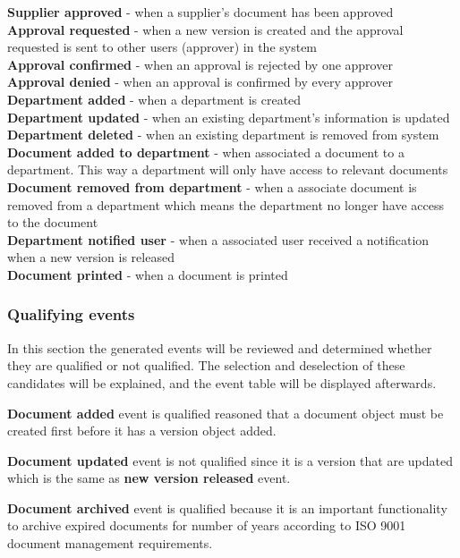 \textbf{Supplier approved} - when a supplier's document has been approved\\
\textbf{Approval requested} - when a new version is created and the approval requested is sent to other users (approver) in the system\\
\textbf{Approval confirmed} - when an approval is rejected by one approver\\
\textbf{Approval denied} - when an approval is confirmed by every approver\\
\textbf{Department added} - when a department is created\\
\textbf{Department updated} - when an existing department's information is updated\\
\textbf{Department deleted} - when an existing department is removed from system\\
\textbf{Document added to department} - when associated a document to a department. This way a department will only have access to relevant documents\\
\textbf{Document removed from department} - when a associate document is removed from a department which means the department no longer have access to the document\\
\textbf{Department notified user} - when a associated user received a notification when a new version is released\\ 
\textbf{Document printed} - when a document is printed\\

\subsubsection{Qualifying events}
In this section the generated events will be reviewed and determined whether they are qualified or not qualified.
The selection and deselection of these candidates will be explained, and the event table will be displayed afterwards.

\textbf{Document added} event is qualified reasoned that a document object must be created first before it has a version object added. 

\textbf{Document updated} event is not qualified since it is a version that are updated which is the same as \textbf{new version released}  event.

\textbf{Document archived} event is qualified because it is an important functionality to archive expired documents for number of years according to ISO 9001 document management requirements. 

